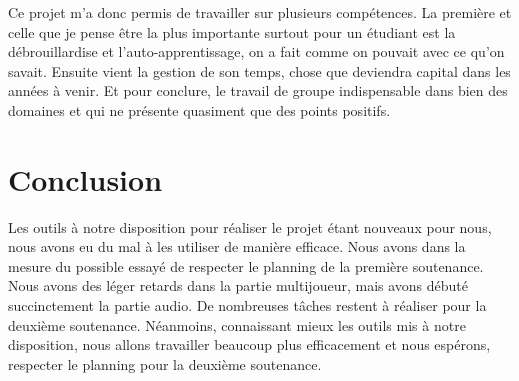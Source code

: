 \documentclass[a4paper, 12pt]{article}
\begin{document}
	\smallbreak
\par Ce projet m’a donc permis de travailler sur plusieurs compétences. La première et celle que je pense être la plus importante surtout pour un étudiant est la débrouillardise et l’auto-apprentissage, on a fait comme on pouvait avec ce qu’on savait. Ensuite vient la gestion de son temps, chose que deviendra capital dans les années à venir. Et pour conclure, le travail de groupe indispensable dans bien des domaines et qui ne présente quasiment que des points positifs.

\section{Conclusion}

Les outils à notre disposition pour réaliser le projet étant  nouveaux pour nous, nous avons eu du mal à les utiliser de manière efficace. Nous avons dans la mesure du possible essayé de respecter le planning de la première soutenance. Nous avons des l\'eger retards dans la partie multijoueur, mais avons d\'ebut\'e succinctement la partie audio. De nombreuses tâches restent à réaliser pour la deuxième soutenance. Néanmoins, connaissant mieux les outils mis à notre disposition, nous allons travailler beaucoup plus efficacement et nous espérons, respecter le planning pour la deuxième soutenance. 
\end{document}
